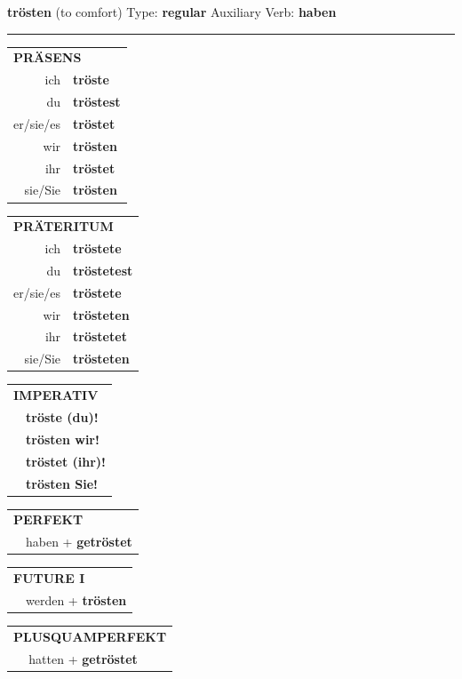 \documentclass[10pt,a4paper]{revtex4-2}
\begin{document}
\begin{verbbox}
{\Large \bf trösten} (to comfort) \hfill Type: \textbf{regular} \hfill Auxiliary Verb: \textbf{haben}

\vspace{5pt}
\hrule
\vspace{5pt}

\begin{tabular}{rl}
\multicolumn{2}{l}{\textbf{PRÄSENS}}\\
ich & \textbf{tröste}\\
du & \textbf{tröstest}\\
er/sie/es & \textbf{tröstet}\\
wir & \textbf{trösten}\\
ihr & \textbf{tröstet}\\
sie/Sie & \textbf{trösten}\\
\end{tabular}
\hfill
\begin{tabular}{rl}
\multicolumn{2}{l}{\textbf{PRÄTERITUM}}\\
ich & \textbf{tröstete}\\
du & \textbf{tröstetest}\\
er/sie/es & \textbf{tröstete}\\
wir & \textbf{trösteten}\\
ihr & \textbf{tröstetet}\\
sie/Sie & \textbf{trösteten}\\
\end{tabular}
\hfill
\begin{tabular}{rl}
\multicolumn{2}{l}{\textbf{IMPERATIV}}\\
& \textbf{tröste (du)!}\\
& \textbf{trösten wir!}\\
& \textbf{tröstet (ihr)!}\\
& \textbf{trösten Sie!}\\
\end{tabular}

\vspace{10pt}

\begin{tabular}{rl}
\multicolumn{2}{l}{\textbf{PERFEKT}}\\
& haben + \textbf{getröstet}\\
\end{tabular}
\hfill
\begin{tabular}{rl}
\multicolumn{2}{l}{\textbf{FUTURE I}}\\
& werden + \textbf{trösten}\\
\end{tabular}
\hfill
\begin{tabular}{rl}
\multicolumn{2}{l}{\textbf{PLUSQUAMPERFEKT}}\\
& hatten + \textbf{getröstet}\\
\end{tabular}


\end{verbbox}
\end{document}
